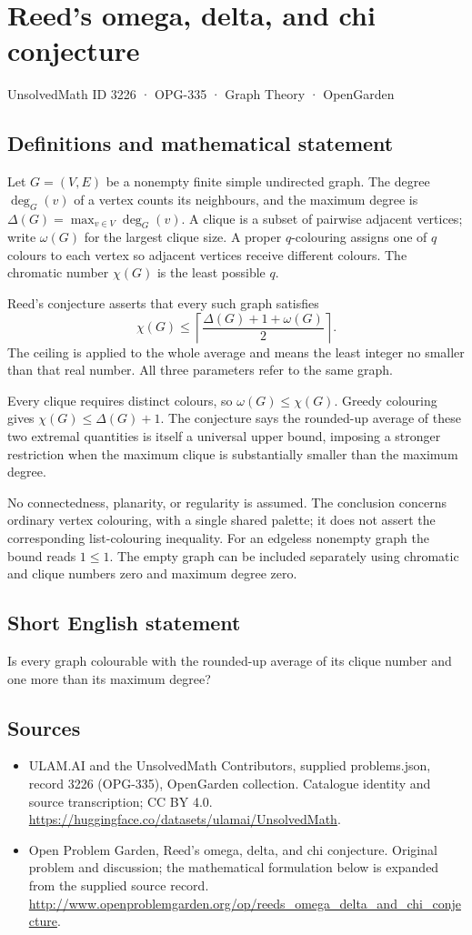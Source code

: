 \documentclass[11pt,a4paper]{article}
\begin{document}
\section*{Reed's omega, delta, and chi conjecture}\label{3226}
{\small UnsolvedMath ID 3226 · OPG-335 · Graph Theory · OpenGarden}
\subsection{Definitions and mathematical statement}
Let $G=(V,E)$ be a nonempty
finite simple undirected graph.
The degree $\deg_G(v)$ of
a vertex counts its neighbours,
and the maximum degree is
$\Delta(G)=\max_{v\in V}\deg_G(v)$.
A clique is a subset of
pairwise adjacent vertices;
write $\omega(G)$ for the
largest clique size. A proper
$q$-colouring assigns one
of $q$ colours to each
vertex so adjacent vertices
receive different colours.
The chromatic number $\chi(G)$
is the least possible $q$.

Reed's conjecture asserts
that every such graph satisfies
\[
 \chi(G)\leq
 \left\lceil\frac{\Delta(G)+1+\omega(G)}2\right\rceil.
\]
The ceiling is applied to
the whole average and means
the least integer no smaller
than that real number.
All three parameters refer
to the same graph.

Every clique requires distinct
colours, so $\omega(G)\leq\chi(G)$.
Greedy colouring gives
$\chi(G)\leq\Delta(G)+1$.
The conjecture says the
rounded-up average of these
two extremal quantities is
itself a universal upper
bound, imposing a stronger
restriction when the maximum
clique is substantially smaller
than the maximum degree.

No connectedness, planarity,
or regularity is assumed.
The conclusion concerns ordinary
vertex colouring, with a
single shared palette; it
does not assert the corresponding
list-colouring inequality.
For an edgeless nonempty graph
the bound reads $1\leq1$.
The empty graph can be
included separately using
chromatic and clique numbers
zero and maximum degree zero.
\subsection{Short English statement}
Is every graph colourable with the rounded-up average of its clique number and one more than its maximum degree?
\subsection{Sources}
\begin{itemize}
\item[S1] ULAM.AI and the UnsolvedMath Contributors, supplied problems.json, record 3226 (OPG-335), OpenGarden collection. Catalogue identity and source transcription; CC BY 4.0.
\url{https://huggingface.co/datasets/ulamai/UnsolvedMath}.
\item[S2] Open Problem Garden, Reed's omega, delta, and chi conjecture. Original problem and discussion; the mathematical formulation below is expanded from the supplied source record.
\url{http://www.openproblemgarden.org/op/reeds_omega_delta_and_chi_conjecture}.
\end{itemize}
\end{document}
